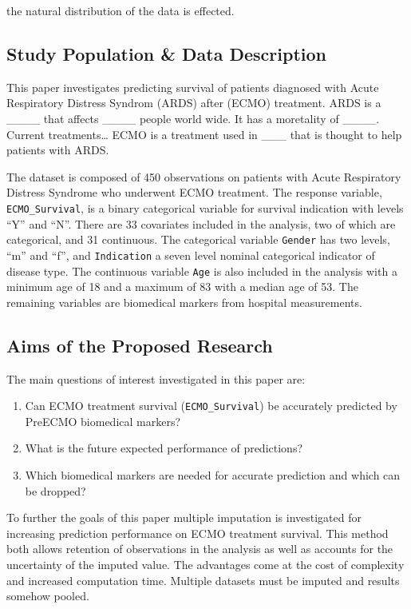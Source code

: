 \documentclass[12pt,]{article}
\providecommand{\tightlist}{%
  \setlength{\itemsep}{0pt}\setlength{\parskip}{0pt}}
\begin{document}
the natural distribution of the data is effected.

\subsection{Study Population \& Data
Description}\label{study-population-data-description}

This paper investigates predicting survival of patients diagnosed with
Acute Respiratory Distress Syndrom (ARDS) after (ECMO) treatment. ARDS
is a \_\_\_\_ that affects \_\_\_\_ people world wide. It has a
moretality of \_\_\_\_. Current treatments\ldots{} ECMO is a treatment
used in \_\_\_ that is thought to help patients with ARDS.

The dataset is composed of 450 observations on patients with Acute
Respiratory Distress Syndrome who underwent ECMO treatment. The response
variable, \texttt{ECMO\_Survival}, is a binary categorical variable for
survival indication with levels ``Y'' and ``N''. There are 33 covariates
included in the analysis, two of which are categorical, and 31
continuous. The categorical variable \texttt{Gender} has two levels,
``m'' and ``f'', and \texttt{Indication} a seven level nominal
categorical indicator of disease type. The continuous variable
\texttt{Age} is also included in the analysis with a minimum age of 18
and a maximum of 83 with a median age of 53. The remaining variables are
biomedical markers from hospital measurements.

\subsection{Aims of the Proposed
Research}\label{aims-of-the-proposed-research}

The main questions of interest investigated in this paper are:

\begin{enumerate}
\def\labelenumi{\arabic{enumi}.}
\tightlist
\item
  Can ECMO treatment survival (\texttt{ECMO\_Survival}) be accurately
  predicted by PreECMO biomedical markers?
\item
  What is the future expected performance of predictions?
\item
  Which biomedical markers are needed for accurate prediction and which
  can be dropped?
\end{enumerate}

To further the goals of this paper multiple imputation is investigated
for increasing prediction performance on ECMO treatment survival. This
method both allows retention of observations in the analysis as well as
accounts for the uncertainty of the imputed value. The advantages come
at the cost of complexity and increased computation time. Multiple
datasets must be imputed and results somehow pooled.
\end{document}
